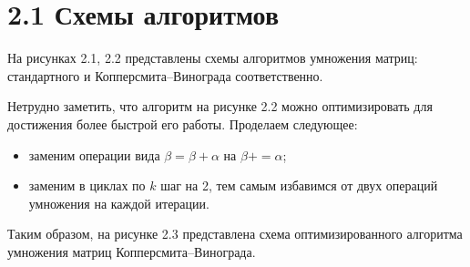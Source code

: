 \documentclass[12pt, a4paper]{report}
\begin{document}
\section*{2.1 Схемы алгоритмов}
На рисунках 2.1, 2.2 представлены схемы алгоритмов умножения матриц: стандартного и Копперсмита--Винограда соответственно.

Нетрудно заметить, что алгоритм на рисунке 2.2 можно оптимизировать для достижения более быстрой его работы. Проделаем следующее:

\begin{itemize}
\item заменим операции вида $\beta = \beta + \alpha$ на $\beta += \alpha$;
\item заменим в циклах по $k$ шаг на 2, тем самым избавимся от двух операций умножения на каждой итерации.
\end{itemize}

Таким образом, на рисунке 2.3 представлена схема оптимизированного алгоритма умножения матриц Копперсмита--Винограда.
\end{document}
